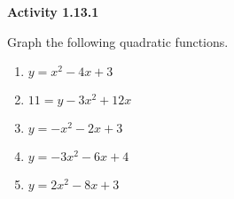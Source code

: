 \noindent\textbf{Activity 1.13.1}


Graph the following quadratic functions.
\begin{multicols}{2}
\begin{enumerate}[label = \color{blue}\arabic*. ]
\item $ y = x^{2} - 4x + 3 $
\item $ 11 = y - 3x^{2} + 12x $
\item $ y = -x^{2} - 2x + 3 $
\item $ y = -3x^{2} - 6x + 4 $
\item $ y = 2x^{2} - 8x + 3 $
\end{enumerate}
\end{multicols} 
